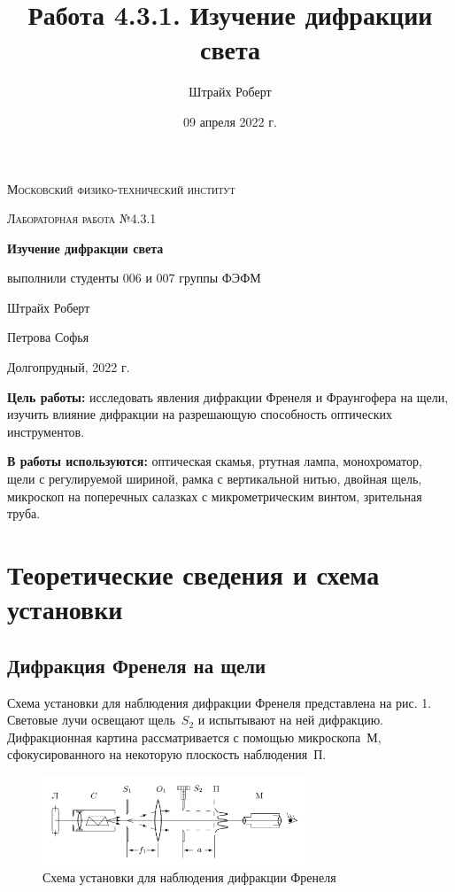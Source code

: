 \documentclass[a4paper, 12pt]{article}
\author{Штрайх Роберт}
\title{Работа 4.3.1. Изучение дифракции света}
\date{09 апреля 2022 г.}
\begin{document}
\begin{titlepage}
	\centering
	\vspace{5cm}
	{\scshape\LARGE Московский физико-технический институт \par}
	\vspace{4cm}
	{\scshape\Large Лабораторная работа №4.3.1 \par}
	\vspace{1cm}
	{\huge\bfseries Изучение дифракции света\par}
	\vspace{1cm}
	\vfill
\begin{flushright}
  {\Large выполнили студенты 006 и 007 группы ФЭФМ}\par
	\vspace{0.3cm}
	{\Large Штрайх Роберт}\par
	\vspace{0.3cm}
	{\Large Петрова Софья}
\end{flushright}


	\vfill

	Долгопрудный, 2022 г.
\end{titlepage}

\newpage

\textbf{Цель работы:} исследовать явления дифракции Френеля и Фраунгофера на щели, изучить влияние дифракции на разрешающую способность оптических инструментов.

\textbf{В работы используются:} оптическая скамья, ртутная лампа, монохроматор, щели с регулируемой шириной, рамка с вертикальной нитью, двойная щель, микроскоп на поперечных салазках с микрометрическим винтом, зрительная труба.

\section{Теоретические сведения и схема установки}
\subsection{Дифракция Френеля на щели}

Схема установки для наблюдения дифракции Френеля представлена на рис. 1. Световые лучи освещают щель~$S_2$ и испытывают на ней дифракцию. Дифракционная картина рассматривается с помощью микроскопа~М, сфокусированного на некоторую плоскость наблюдения~П.
		\begin{figure}[h]
		\begin{center}
			\includegraphics[width = 0.7\textwidth]{431-1.png}
			\caption{Схема установки для наблюдения дифракции Френеля}
		\end{center}
	\end{figure}
\end{document}
